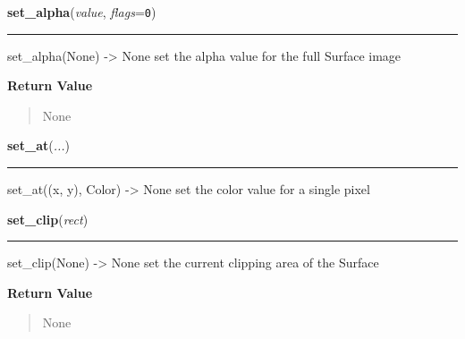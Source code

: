 \hspace{.8\funcindent}\begin{boxedminipage}{\funcwidth}

    \raggedright \textbf{set\_alpha}(\textit{value}, \textit{flags}={\tt 0})

    \vspace{-1.5ex}

    \rule{\textwidth}{0.5\fboxrule}
\setlength{\parskip}{2ex}
    set\_alpha(None) -{\textgreater} None set the alpha value for the full 
    Surface image

\setlength{\parskip}{1ex}
      \textbf{Return Value}
    \vspace{-1ex}

      \begin{quote}
      None

      \end{quote}

    \end{boxedminipage}

    \label{pygame:Surface:set_at}

    \vspace{0.5ex}

\hspace{.8\funcindent}\begin{boxedminipage}{\funcwidth}

    \raggedright \textbf{set\_at}(\textit{...})

    \vspace{-1.5ex}

    \rule{\textwidth}{0.5\fboxrule}
\setlength{\parskip}{2ex}
    set\_at((x, y), Color) -{\textgreater} None set the color value for a 
    single pixel

\setlength{\parskip}{1ex}
    \end{boxedminipage}

    \label{pygame:Surface:set_clip}

    \vspace{0.5ex}

\hspace{.8\funcindent}\begin{boxedminipage}{\funcwidth}

    \raggedright \textbf{set\_clip}(\textit{rect})

    \vspace{-1.5ex}

    \rule{\textwidth}{0.5\fboxrule}
\setlength{\parskip}{2ex}
    set\_clip(None) -{\textgreater} None set the current clipping area of 
    the Surface

\setlength{\parskip}{1ex}
      \textbf{Return Value}
    \vspace{-1ex}

      \begin{quote}
      None

      \end{quote}

    \end{boxedminipage}

